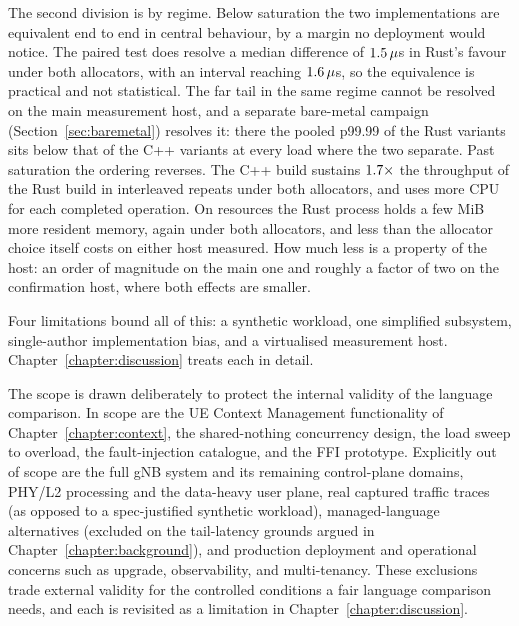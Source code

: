 \documentclass[english,oneside,a4paper,censored,csm,software-track-2020]{HYthesisML}
\begin{document}
The second division is by regime. Below saturation the two implementations are equivalent end to
end in central behaviour, by a margin no deployment would notice. The paired test does resolve a
median difference of $1.5\,\mu$s in Rust's favour under both allocators, with an
interval reaching $1.6\,\mu$s, so the equivalence is practical and not statistical.
The far tail in the same regime cannot be resolved on the main measurement host, and a separate
bare-metal campaign (Section~\ref{sec:baremetal}) resolves it: there the pooled p99.99 of the
Rust variants sits below that of the C++ variants at every load where the two separate. Past saturation
the ordering reverses. The C++ build sustains $1.7\times$ the throughput of the Rust
build in \OverloadThrAgree{} interleaved repeats under both allocators, and uses more CPU for each
completed operation. On resources the Rust process holds a few MiB more resident memory, again
under both allocators, and less than the allocator choice itself costs on either host measured. How
much less is a property of the host: an order of magnitude on the main one and roughly a factor of
two on the confirmation host, where both effects are smaller.

Four limitations bound all of this: a synthetic workload, one simplified subsystem,
single-author implementation bias, and a virtualised measurement host.
Chapter~\ref{chapter:discussion} treats each in detail.

The scope is drawn deliberately to protect the internal validity of the language comparison. In
scope are the UE Context Management functionality of Chapter~\ref{chapter:context}, the
shared-nothing concurrency design, the load sweep to overload, the fault-injection catalogue,
and the FFI prototype. Explicitly out of scope are the full gNB system and its remaining
control-plane domains, PHY/L2 processing and the data-heavy user plane, real captured traffic
traces (as opposed to a spec-justified synthetic workload), managed-language alternatives
(excluded on the tail-latency grounds argued in Chapter~\ref{chapter:background}), and
production deployment and operational concerns such as upgrade, observability, and
multi-tenancy. These exclusions trade external validity for the controlled conditions a fair
language comparison needs, and each is revisited as a limitation in
Chapter~\ref{chapter:discussion}.
\end{document}
